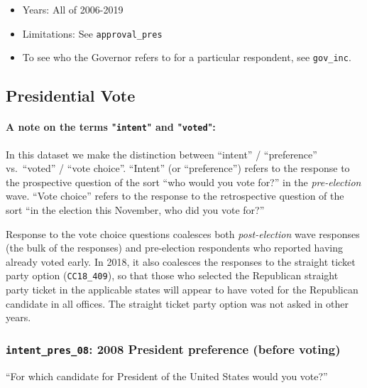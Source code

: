 \documentclass[10pt,article,oneside]{memoir}
\theoremstyle{definition}
\begin{document}
\begin{itemize}
\tightlist
\item
  Years: All of 2006-2019
\item
  Limitations: See \texttt{approval\_pres}
\item
  To see who the Governor refers to for a particular respondent, see
  \texttt{gov\_inc}.
\end{itemize}

\newpage

\hypertarget{presidential-vote}{%
\subsection{Presidential Vote}\label{presidential-vote}}

\paragraph{A note on the terms "\texttt{intent}" and "\texttt{voted}":}

In this dataset we make the distinction between ``intent'' /
``preference'' vs.~``voted'' / ``vote choice''. ``Intent'' (or
``preference'') refers to the response to the prospective question of
the sort ``who would you vote for?'' in the \emph{pre-election} wave.
``Vote choice'' refers to the response to the retrospective question of
the sort ``in the election this November, who did you vote for?''

Response to the vote choice questions coalesces both
\emph{post-election} wave responses (the bulk of the responses) and
pre-election respondents who reported having already voted early. In
2018, it also coalesces the responses to the straight ticket party
option (\texttt{CC18\_409}), so that those who selected the Republican
straight party ticket in the applicable states will appear to have voted
for the Republican candidate in all offices. The straight ticket party
option was not asked in other years.

\hypertarget{intent_pres_08-2008-president-preference-before-voting}{%
\subsubsection{\texorpdfstring{\texttt{intent\_pres\_08}: 2008 President
preference (before
voting)}{intent\_pres\_08: 2008 President preference (before voting)}}\label{intent_pres_08-2008-president-preference-before-voting}}

``For which candidate for President of the United States would you
vote?''
\end{document}
